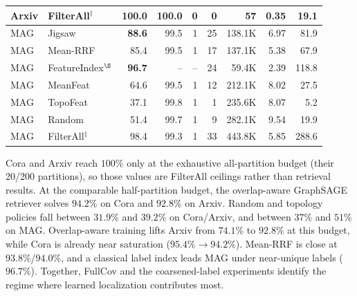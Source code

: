 \documentclass{article}
\begin{document}
\begin{table}[t]
\begin{tabular}{llrrrrrrr}
Arxiv & FilterAll$^\ddagger$ & 100.0 & 100.0 & 0 & 0 & 57 & 0.35 & 19.1 \\
\midrule
MAG & Jigsaw & \textbf{88.6} & 99.5 & 1 & 25 & 138.1K & 6.97 & 81.9 \\
MAG & Mean-RRF & 85.4 & 99.5 & 1 & 17 & 137.1K & 5.38 & 67.9 \\
MAG & FeatureIndex$^\S$ & \textbf{96.7} & -- & -- & 24 & 59.4K & 2.39 & 118.8 \\
MAG & MeanFeat & 64.6 & 99.5 & 1 & 12 & 212.1K & 8.02 & 27.5 \\
MAG & TopoFeat & 37.1 & 99.8 & 1 & 1 & 235.6K & 8.07 & 5.2 \\
MAG & Random & 51.4 & 99.7 & 1 & 9 & 282.1K & 9.54 & 19.9 \\
MAG & FilterAll$^\ddagger$ & 98.4 & 99.3 & 1 & 33 & 443.8K & 5.85 & 288.6 \\
\bottomrule
\end{tabular}
\end{table}

Cora and Arxiv reach $100\%$ only at the exhaustive all-partition budget (their 20/200 partitions), so those values are FilterAll ceilings rather than retrieval results. At the comparable half-partition budget, the overlap-aware GraphSAGE retriever solves $94.2\%$ on Cora and $92.8\%$ on Arxiv. Random and topology policies fall between $31.9\%$ and $39.2\%$ on Cora/Arxiv, and between $37\%$ and $51\%$ on MAG. Overlap-aware training lifts Arxiv from $74.1\%$ to $92.8\%$ at this budget, while Cora is already near saturation ($95.4\%\!\to\!94.2\%$). Mean-RRF is close at $93.8\%$/$94.0\%$, and a classical label index leads MAG under near-unique labels ($96.7\%$). Together, FullCov and the coarsened-label experiments identify the regime where learned localization contributes most.
\end{document}
